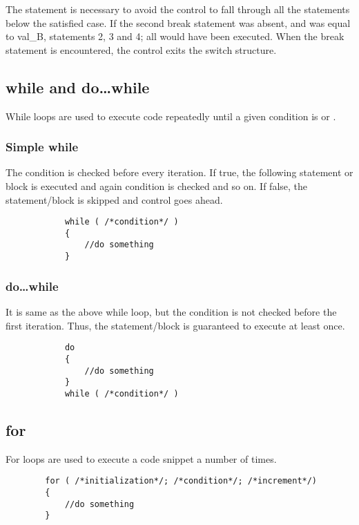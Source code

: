\documentclass{article}
\begin{document}
		The  statement is necessary to avoid the control to fall through all the statements below the satisfied case. If the second break statement was absent, and  was equal to val\_B, statements 2, 3 and 4; all would have been executed. When the break statement is encountered, the control exits the switch structure.

	\subsection{while and do\ldots while}

		While loops are used to execute code repeatedly until a given condition is  or .

		\subsubsection{Simple while}

			The condition is checked before every iteration. If true, the following statement or block is executed and again condition is checked and so on. If false, the statement/block is skipped and control goes ahead.

			\begin{lstlisting}
			while ( /*condition*/ )
			{
				//do something
			}
			\end{lstlisting}

		\subsubsection{do\ldots while}

			It is same as the above while loop, but the condition is not checked before the first iteration. Thus, the statement/block is guaranteed to execute at least once.

			\begin{lstlisting}
			do
			{
				//do something
			}
			while ( /*condition*/ )
			\end{lstlisting}

	\subsection{for}

		For loops are used to execute a code snippet a number of times.

		\begin{lstlisting}
		for ( /*initialization*/; /*condition*/; /*increment*/)
		{
			//do something
		}
		\end{lstlisting}
\end{document}
